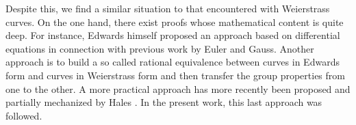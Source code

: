 Despite this, we find a similar situation to that encountered with Weierstrass curves. On the one hand, there exist proofs whose mathematical content is quite deep. For instance,  Edwards himself proposed an approach based on differential equations in connection with previous work by Euler and Gauss. Another approach is to build a so called rational equivalence between curves in Edwards form and curves in Weierstrass form \cite{das2008pairing} and then transfer the group properties from one to the other. A more practical approach has more recently been proposed and partially mechanized by Hales \cite{edwards2007normal}. In the present work, this last approach was followed.
